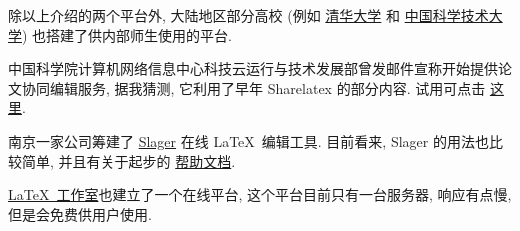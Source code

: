 除以上介绍的两个平台外,
大陆地区部分高校 (例如%
\href{https://overleaf.tsinghua.edu.cn/login}{清华大学}%
和%
\href{https://latex.ustc.edu.cn/login}{中国科学技术大学}) 也搭建了供内部师生使用的平台.

中国科学院计算机网络信息中心科技云运行与技术发展部曾发邮件宣称开始提供论文协同编辑服务,
据我猜测,
它利用了早年 Sharelatex 的部分内容.
试用可点击%
\href{https://www.cstcloud.cn/resources/452}{这里}.

南京一家公司筹建了
\href{https://www.slager.link/#/Home}{Slager} 在线 \LaTeX\ 编辑工具.
目前看来,
Slager 的用法也比较简单,
并且有关于起步的%
\href{https://www.slager.link/#/HelpCenter}{帮助文档}.

\href{https://online.latexstudio.net/}{\LaTeX\ 工作室}也建立了一个在线平台,
这个平台目前只有一台服务器,
响应有点慢,
但是会免费供用户使用.

